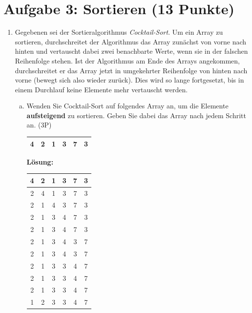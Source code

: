 \documentclass{scrartcl}
\begin{document}
\section*{Aufgabe 3: Sortieren (13 Punkte)}
\begin{enumerate}[(1)]
\item Gegebenen sei der Sortieralgorithmus \emph{Cocktail-Sort}. Um ein Array zu sortieren, durchschreitet der Algorithmus das Array zun\"achst von vorne nach hinten und vertauscht dabei zwei benachbarte Werte, wenn sie in der falschen Reihenfolge stehen. Ist der Algorithmus am Ende des Arrays angekommen, durchschreitet er das Array jetzt in umgekehrter Reihenfolge von hinten nach vorne (bewegt sich also \glqq wieder zur\"uck\grqq). Dies wird so lange fortgesetzt, bis in einem Durchlauf keine Elemente mehr vertauscht werden.
\begin{enumerate}[(a)]
\item Wenden Sie Cocktail-Sort auf folgendes Array an, um die Elemente \textbf{aufsteigend} zu sortieren. Geben Sie dabei das Array nach jedem Schritt an. (3P)
\\
\begin{center}
\begin{tabular}{|c|c|c|c|c|c|}
\hline
4 & 2 & 1 & 3 & 7 & 3 \\
\hline
\end{tabular}
\end{center}
\pagebreak
\textbf{Lösung:}\\
\begin{center}
\begin{tabular}{|c|c|c|c|c|c|}
\hline
4 & 2 & 1 & 3 & 7 & 3 \\
\hline
2 & 4 & 1 & 3 & 7 & 3 \\
\hline
2 & 1 & 4 & 3 & 7 & 3 \\
\hline
2 & 1 & 3 & 4 & 7 & 3 \\
\hline
2 & 1 & 3 & 4 & 7 & 3 \\
\hline
2 & 1 & 3 & 4 & 3 & 7 \\
\hline
2 & 1 & 3 & 4 & 3 & 7 \\
\hline
2 & 1 & 3 & 3 & 4 & 7 \\
\hline
2 & 1 & 3 & 3 & 4 & 7 \\
\hline
2 & 1 & 3 & 3 & 4 & 7 \\
\hline
1 & 2 & 3 & 3 & 4 & 7 \\
\hline
\end{tabular}
\end{center}


\end{enumerate}
\end{enumerate}
\end{document}
